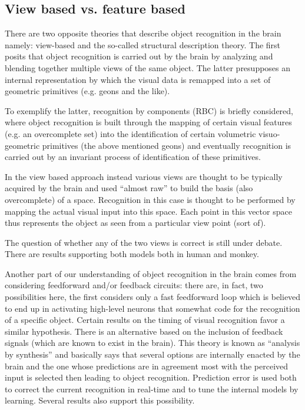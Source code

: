 \subsection{View based vs. feature based}

There are two opposite theories that describe object recognition in the brain namely: view-based and the so-called structural description theory. The first posits that object recognition is carried out by the brain by analyzing and blending together multiple views of the same object. The latter presupposes an internal representation by which the visual data is remapped into a set of geometric primitives (e.g. geons and the like).

To exemplify the latter, recognition by components (RBC) is briefly considered, where object recognition is built through the mapping of certain visual features (e.g. an overcomplete set) into the identification of certain volumetric visuo-geometric primitives (the above mentioned geons) and eventually recognition is carried out by an invariant process of identification of these primitives.

In the view based approach instead various views are thought to be typically acquired by the brain and used ``almost raw'' to build the basis (also overcomplete) of a space. Recognition in this case is thought to be performed by mapping the actual visual input into this space. Each point in this vector space thus represents the object as seen from a particular view point (sort of).

The question of whether any of the two views is correct is still under debate. There are results supporting both models both in human and monkey.

Another part of our understanding of object recognition in the brain comes from considering feedforward and/or feedback circuits: there are, in fact, two possibilities here, the first considers only a fast feedforward loop which is believed to end up in activating high-level neurons that somewhat code for the recognition of a specific object. Certain results on the timing of visual recognition favor a similar hypothesis. There is an alternative based on the inclusion of feedback signals (which are known to exist in the brain). This theory is known as ``analysis by synthesis'' and basically says that several options are internally enacted by the brain and the one whose predictions are in agreement most with the perceived input is selected then leading to object recognition. Prediction error is used both to correct the current recognition in real-time and to tune the internal models by learning. Several results also support this possibility.

